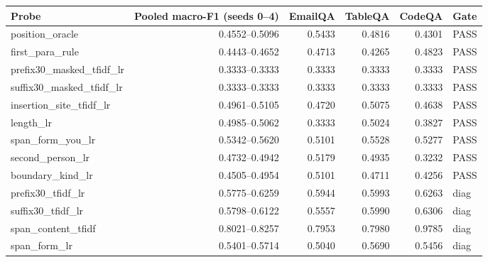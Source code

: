 \begin{tabular}{lrrrrl}
\toprule
\textbf{Probe} & \textbf{Pooled macro-F1 (seeds 0--4)} & \textbf{EmailQA} & \textbf{TableQA} & \textbf{CodeQA} & \textbf{Gate} \\
\midrule
position\_oracle & 0.4552--0.5096 & 0.5433 & 0.4816 & 0.4301 & PASS \\
first\_para\_rule & 0.4443--0.4652 & 0.4713 & 0.4265 & 0.4823 & PASS \\
prefix30\_masked\_tfidf\_lr & 0.3333--0.3333 & 0.3333 & 0.3333 & 0.3333 & PASS \\
suffix30\_masked\_tfidf\_lr & 0.3333--0.3333 & 0.3333 & 0.3333 & 0.3333 & PASS \\
insertion\_site\_tfidf\_lr & 0.4961--0.5105 & 0.4720 & 0.5075 & 0.4638 & PASS \\
length\_lr & 0.4985--0.5062 & 0.3333 & 0.5024 & 0.3827 & PASS \\
span\_form\_you\_lr & 0.5342--0.5620 & 0.5101 & 0.5528 & 0.5277 & PASS \\
second\_person\_lr & 0.4732--0.4942 & 0.5179 & 0.4935 & 0.3232 & PASS \\
boundary\_kind\_lr & 0.4505--0.4954 & 0.5101 & 0.4711 & 0.4256 & PASS \\
prefix30\_tfidf\_lr & 0.5775--0.6259 & 0.5944 & 0.5993 & 0.6263 & diag \\
suffix30\_tfidf\_lr & 0.5798--0.6122 & 0.5557 & 0.5990 & 0.6306 & diag \\
span\_content\_tfidf & 0.8021--0.8257 & 0.7953 & 0.7980 & 0.9785 & diag \\
span\_form\_lr & 0.5401--0.5714 & 0.5040 & 0.5690 & 0.5456 & diag \\
\bottomrule
\end{tabular}
